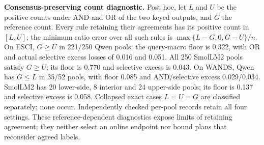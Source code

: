 \textbf{Consensus-preserving count diagnostic.}
Post hoc, let $L$ and $U$ be the positive counts under AND and OR of the two keyed
outputs, and $G$ the reference count. Every rule retaining their agreements has
its positive count in $[L,U]$; the minimum ratio error over all such rules is
$\max\{L-G,0,G-U\}/n$. On ESCI, $G\geq U$ in 221/250 Qwen pools;
the query-macro floor is 0.322, with OR and actual selective excess losses
of 0.016 and 0.051. All 250 SmolLM2 pools satisfy $G\geq U$; its floor is
0.770 and selective excess is 0.043. On WANDS, Qwen has $G\leq L$ in 35/52
pools, with floor 0.085 and AND/selective excess 0.029/0.034. SmolLM2 has
20 lower-side, 8 interior and 24 upper-side pools; its floor is 0.137 and
selective excess is 0.058. Collapsed exact cases $L=U=G$ are classified separately;
none occur. Independently checked per-pool records retain all four settings.
These reference-dependent diagnostics expose limits of retaining agreement;
they neither select an online endpoint nor bound plans that reconsider agreed labels.
